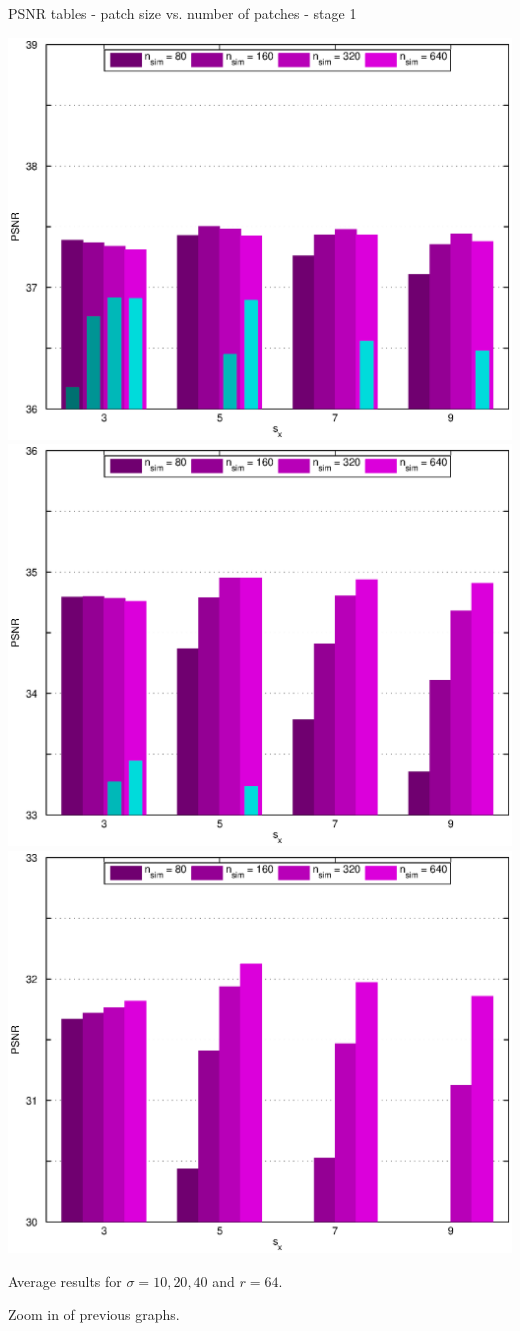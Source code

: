 \documentclass[mathserif, 8pt]{beamer}
\makeatletter
\newcounter{multipleslide}
\newcommand{\restoreframe}{%
\patchcmd{\beamer@@tmpl@footline}%
	{\themultipleslide}%
	{\insertframenumber}%
	{}%
	{}%
\setcounter{framenumber}{\value{multipleslide}}%
}
\makeatother
\begin{document}
\begin{frame}{PSNR tables - patch size vs. number of patches - stage 1}
	\begin{center}
		\includegraphics[width=.33\textwidth]{zoom_psnr_px1-np1-bars_1r64_s10_average.eps}%
		\includegraphics[width=.33\textwidth]{zoom_psnr_px1-np1-bars_1r64_s20_average.eps}%
		\includegraphics[width=.33\textwidth]{zoom_psnr_px1-np1-bars_1r64_s40_average.eps}
	\end{center}
	\begin{center}
	Average results for $\sigma = 10, 20, 40$ and $r = 64$. 
	\bigskip
	
	Zoom in of previous graphs.
	\end{center}
\end{frame}
\restoreframe
\end{document}
